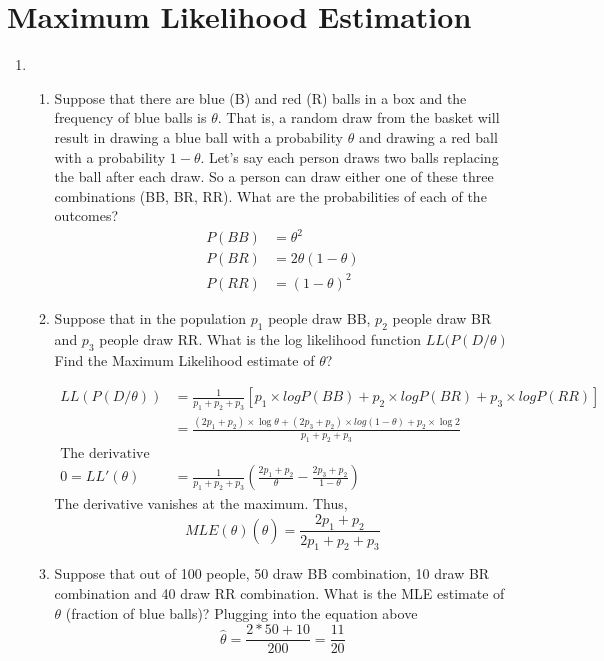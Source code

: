 

\section{Maximum Likelihood Estimation}

\begin{enumerate}
\item 
\begin{enumerate}
    \item  Suppose that there are blue (B) and red (R) balls in a box and the frequency of blue balls is $\theta$. That is, a random draw from the basket will result in drawing a blue ball with a probability $\theta$ and drawing a red ball with a probability $1-\theta$. Let's say each person draws two balls replacing the ball after each draw. So a person can draw either one of these three combinations (BB, BR, RR). What are the probabilities of each of the outcomes?
    \begin{align*}
        P(BB) &= \theta^2\\
        P(BR) &= 2\theta(1-\theta)\\
        P(RR) &= (1-\theta)^2
    \end{align*}
    
    
    \item  Suppose that in the population $p_1$ people draw BB, $p_2$ people draw BR and $p_3$ people draw RR. What is the log likelihood function $LL(P(D/\theta)$  Find the Maximum Likelihood estimate of $\theta$?
    
    \begin{align*}
        LL(P(D/\theta)) &= \frac{1}{p_1+p_2+p_3}[p_1 \times logP(BB)+p_2 \times logP(BR)+p_3 \times logP(RR)]\\
        				&=\frac{(2p_1+p_2) \times \log \theta +(2p_3+p_2) \times log (1-\theta) + p_2 \times \log 2}{p_1+p_2+p_3} \\
        				\text{The derivative vanishes at the maximum:} \\	
0 = LL'(\theta) &= \frac{1}{p_1+p_2+p_3} (\frac{2p_1+p_2}{\theta} - \frac{2p_3+p_2}{1-\theta})
\end{align*}
   The derivative vanishes at the maximum.
    Thus,
   $$ MLE(\theta)(\hat{\theta}) = \frac{2p_1+p_2}{2p_1+p_2+p_3}$$
    
    

    \item  Suppose that out of 100 people, 50 draw BB combination, 10 draw BR combination and 40 draw RR combination. What is the MLE estimate of $\theta$ (fraction of blue balls)?
    Plugging into the equation above
            $$ \hat{\theta} = \frac{2*50+10}{200}=\frac{11}{20} $$
            

\end{enumerate}
\end{enumerate}
